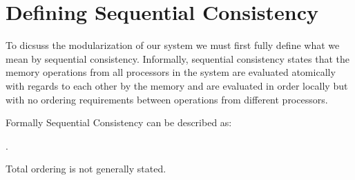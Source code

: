\section{Defining Sequential Consistency}

To dicsuss the modularization of our system we must first fully define what we
mean by sequential consistency. Informally, sequential consistency states that
the memory operations from all processors in the system are evaluated
atomically with regards to each other by the memory and are evaluated in order
locally but with no ordering requirements between operations from different
processors.

Formally Sequential Consistency can be described as:

. 


Total ordering is not generally stated. 




